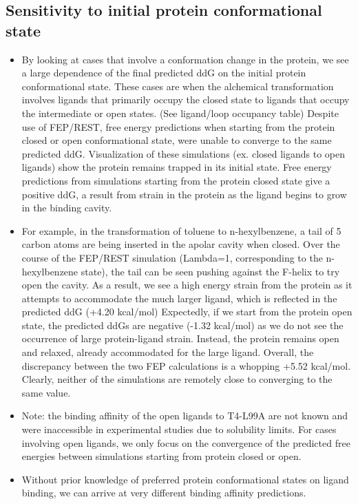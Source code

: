 \documentclass{article}
\begin{document}
\subsection{Sensitivity to initial protein conformational state}
   \begin{itemize}
   \item By looking at cases that involve a conformation change in the protein, we see a large dependence of the final predicted ddG on the initial protein conformational state.
      These cases are when the alchemical transformation involves ligands that primarily occupy the closed state to ligands that occupy the intermediate or open states. (See ligand/loop occupancy table)
      Despite use of FEP/REST, free energy predictions when starting from the protein closed or open conformational state, were unable to converge to the same predicted ddG.
      Visualization of these simulations (ex. closed ligands to open ligands) show the protein remains trapped in its initial state.
      Free energy predictions from simulations starting from the protein closed state give a positive ddG, a result from strain in the protein as the ligand begins to grow in the binding cavity.
   \item For example, in the transformation of toluene to n-hexylbenzene, a tail of 5 carbon atoms are being inserted in the apolar cavity when closed.
      Over the course of the FEP/REST simulation (Lambda=1, corresponding to the n-hexylbenzene state), the tail can be seen pushing against the F-helix to try open the cavity.
      As a result, we see a high energy strain from the protein as it attempts to accommodate the much larger ligand, which is reflected in the predicted ddG (+4.20 kcal/mol)
      Expectedly, if we start from the protein open state, the predicted ddGs are negative (-1.32 kcal/mol) as we do not see the occurrence of large protein-ligand strain.
      Instead, the protein remains open and relaxed, already accommodated for the large ligand.
      Overall, the discrepancy between the two FEP calculations is a whopping +5.52 kcal/mol.
      Clearly, neither of the simulations are remotely close to converging to the same value. 
   \item Note: the binding affinity of the open ligands to T4-L99A are not known and were inaccessible in experimental studies due to solubility limits. \cite{Merski2015}
      For cases involving open ligands, we only focus on the convergence of the predicted free energies between simulations starting from protein closed or open.
   \item Without prior knowledge of preferred protein conformational states on ligand binding, we can arrive at very different binding affinity predictions.

\end{itemize}
\end{document}

